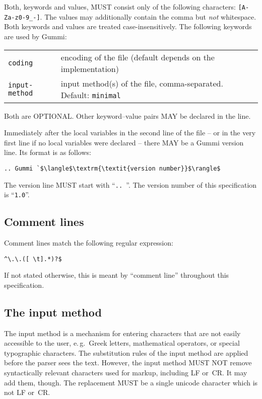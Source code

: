 \documentclass[12pt,openany]{book}
\begin{document}
Both, keywords and values, MUST consist only of the following characters:
\verb|[A-Za-z0-9_-]|.  The values may additionally contain the comma but
\emph{not} whitespace.  Both keywords and values are treated
case-insensitively.  The following keywords are used by Gummi:

\begin{center}
\begin{tabular}{@{}lp{7cm}@{}}
  \toprule
  \verb|coding| & encoding of the file (default depends on the implementation)\\
  \verb|input-method| & input method(s) of the file, comma-separated.  Default:
                          \verb|minimal|\\
  \bottomrule
\end{tabular}
\end{center}

\noindent
Both are OPTIONAL\@.  Other keyword--value pairs MAY be declared in the line.

\bigskip
%
Immediately after the local variables in the second line of the file -- or in
the very first line if no local variables were declared -- there MAY be a Gummi
version line.  Its format is as follows:
\begin{lstlisting}[escapechar=`]
.. Gummi `$\langle$\textrm{\textit{version number}}$\rangle$
\end{lstlisting}
The version line MUST start with ``\verb*|.. |''.  The version number of this
specification is ``\verb|1.0|''.


\subsection{Comment lines}

Comment lines match the following regular expression:

\begin{verbatim}
^\.\.([ \t].*)?$
\end{verbatim}

\noindent
If not stated otherwise, this is meant by ``comment line'' throughout this
specification.

\subsection{The input method}
\label{sec:input-method}

The input method is a mechanism for entering characters that are not easily
accessible to the user, e.\,g.\ Greek letters, mathematical operators, or
special typographic characters.  The substitution rules of the input method are
applied before the parser sees the text.  However, the input method MUST NOT
remove syntactically relevant characters used for markup, including LF or~CR\@.
It may add them, though.  The replacement MUST be a single unicode character
which is not LF or~CR\@.
\end{document}

